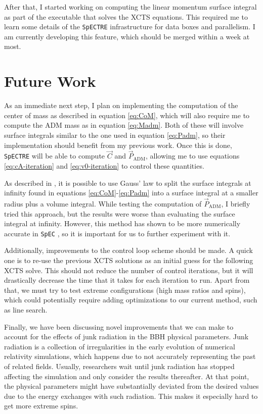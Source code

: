 \documentclass{../document}
\begin{document}
  After that, I started working on computing the linear momentum surface integral as part of the executable that solves the XCTS equations. This required me to learn some details of the {\tt SpECTRE} infrastructure for data boxes and parallelism. I am currently developing this feature, which should be merged within a week at most.

	\section{Future Work}

  As an immediate next step, I plan on implementing the computation of the center of mass as described in equation \eqref{eq:CoM}, which will also require me to compute the ADM mass as in equation \eqref{eq:Madm}. Both of these will involve surface integrals similar to the one used in equation \eqref{eq:Padm}, so their implementation should benefit from my previous work. Once this is done, {\tt SpECTRE} will be able to compute $\vec C$ and $\vec P_\text{ADM}$, allowing me to use equations \eqref{eq:cA-iteration} and \eqref{eq:v0-iteration} to control these quantities.

  As described in \cite{Serguei}, it is possible to use Gauss' law to split the surface integrals at infinity found in equations \eqref{eq:CoM}-\eqref{eq:Padm} into a surface integral at a smaller radius plus a volume integral. While testing the computation of $\vec P_\text{ADM}$, I briefly tried this approach, but the results were worse than evaluating the surface integral at infinity. However, this method has shown to be more numerically accurate in {\tt SpEC} \cite{Serguei}, so it is important for us to further experiment with it.

  Additionally, improvements to the control loop scheme should be made. A quick one is to re-use the previous XCTS solutions as an initial guess for the following XCTS solve. This should not reduce the number of control iterations, but it will drastically decrease the time that it takes for each iteration to run. Apart from that, we must try to test extreme configurations (high mass ratios and spins), which could potentially require adding optimizations to our current method, such as line search.

  Finally, we have been discussing novel improvements that we can make to account for the effects of junk radiation in the BBH physical parameters. Junk radiation is a collection of irregularities in the early evolution of numerical relativity simulations, which happens due to not accurately representing the past of related fields. Usually, researchers wait until junk radiation has stopped affecting the simulation and only consider the results thereafter. At that point, the physical parameters might have substantially deviated from the desired values due to the energy exchanges with such radiation. This makes it especially hard to get more extreme spins.
  
\end{document}
